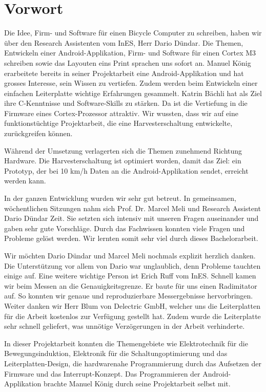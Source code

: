 \chapter{Vorwort}

Die Idee, Firm- und Software für einen Bicycle Computer zu schreiben, haben wir über den Research Assistenten vom InES, Herr Dario Dündar. Die Themen, Entwickeln einer Android-Applikation, Firm- und Software für einen Cortex M3 schreiben sowie das Layouten eins Print sprachen uns sofort an. Manuel König erarbeitete bereits in seiner Projektarbeit eine Android-Applikation und hat grosses Interesse, sein Wissen zu vertiefen. Zudem werden beim Entwickeln einer einfachen Leiterplatte wichtige Erfahrungen gesammelt. Katrin Bächli hat als Ziel ihre C-Kenntnisse und Software-Skills zu stärken. Da ist die Vertiefung in die Firmware eines Cortex-Prozessor attraktiv. Wir wussten, dass wir auf eine funktionstüchtige Projektarbeit, die eine Harvesterschaltung entwickelte, zurückgreifen können.

Während der Umsetzung verlagerten sich die Themen zunehmend Richtung Hardware. Die Harvesterschaltung ist optimiert worden, damit das Ziel: ein Prototyp, der bei 10 km/h Daten an die Android-Applikation sendet, erreicht werden kann.

In der ganzen Entwicklung wurden wir sehr gut betreut. In gemeinsamen, wöchentlichen Sitzungen nahm sich Prof. Dr. Marcel Meli und Research Assistent Dario Dündar Zeit. Sie setzten sich intensiv mit unseren Fragen auseinander und gaben sehr gute Vorschläge. Durch das Fachwissen konnten viele Fragen und Probleme gelöst werden. Wir lernten somit sehr viel durch dieses Bachelorarbeit. 

Wir möchten Dario Dündar und Marcel Meli nochmals explizit herzlich danken. Die Unterstützung vor allem von Dario war unglaublich, denn Probleme tauchten einige auf. Eine weitere wichtige Person ist Erich Ruff vom InES. Schnell kamen wir beim Messen an die Genauigkeitsgrenze. Er baute für uns einen Radimitator auf. So konnten wir genaue und reproduzierbare Messergebnisse hervorbringen. Weiter danken wir Herr Blum von Delectric GmbH, welcher uns die Leiterplatten für die Arbeit kostenlos zur Verfügung gestellt hat. Zudem wurde die Leiterplatte sehr schnell geliefert, was unnötige Verzögerungen in der Arbeit verhinderte.

In dieser Projektarbeit konnten die Themengebiete wie Elektrotechnik für die Bewegungsinduktion, Elektronik für die Schaltungoptimierung und das Leiterplatten-Design, die hardwarenahe Programmierung durch das Aufsetzen der Firmware und das Interrupt-Konzept. Das Programmieren der Android-Applikation brachte Manuel König durch seine Projektarbeit selbst mit.

